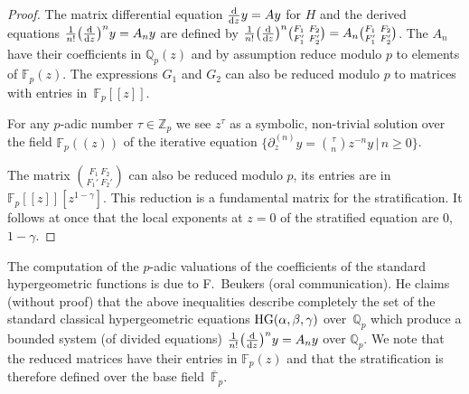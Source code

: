 \documentclass[10pt,a4paper]{amsart}
\numberwithin{equation}{section}
\begin{document}
\begin{proof}
The matrix differential equation $\frac{{\rm d}}{{\rm d}z} y=Ay$ for $H$ and the derived equations $\frac{1}{n!}\big(\frac{{\rm d}}{{\rm d}z}\big)^ny=A_ny$ are defined by $\frac{1}{n!}\big(\frac{{\rm d}}{{\rm d}z}\big)^n {F_1\ F_2 \choose F_1'\ F_2'}=A_n{F_1\ F_2 \choose F_1' \ F_2'}$. The $A_n$ have their coefficients in $\mathbb{Q}_p(z)$ and by assumption reduce modulo $p$ to elements of $\mathbb{F}_p(z)$. The expressions $G_1$ and $G_2$ can also be reduced modulo $p$ to matrices with entries in~$\mathbb{F}_p[[z]]$.

For any $p$-adic number $\tau \in \mathbb{Z}_p$ we see $z^\tau$ as a symbolic, non-trivial solution over the field $\mathbb{F}_p((z))$ of the iterative equation $\big\{\partial_z^{(n)}y={\tau \choose n }z^{-n}y\, | \, n\geq 0\big\}$.

The matrix ${F_1\ F_2 \choose F_1'\ F_2'}$ can also be reduced modulo $p$, its entries are in $\mathbb{F}_p[[z]][z^{1-\gamma}]$. This reduction is a fundamental matrix for the stratification. It follows at once that the local exponents at $z=0$ of the stratified equation are $0$, $1-\gamma$. \end{proof}

The computation of the $p$-adic valuations of the coefficients of the standard hypergeometric functions is due to F.~Beukers (oral communication). He claims (without proof) that the above inequalities describe completely the set of the standard classical hypergeometric equations ${\rm HG}(\alpha, \beta ,\gamma)$ over~$\mathbb{Q}_p$ which produce a bounded system (of divided equations) $\frac{1}{n!}\big(\frac{{\rm d}}{{\rm d}z}\big)^ny=A_ny$ over $\mathbb{Q}_p$. We note that the reduced matrices have their entries in $\mathbb{F}_p(z)$ and that the stratification is therefore defined over the base field~$\overline{\mathbb{F}}_p$.
\end{document}
